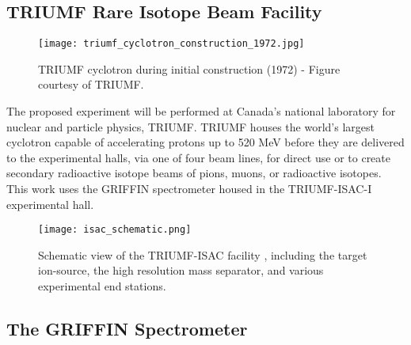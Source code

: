 \documentclass[cnatzke_thesis_proposal.tex]{subfiles}
\begin{document}
\subsection{TRIUMF Rare Isotope Beam Facility}
\begin{figure}[H]
  \begin{center}
    \texttt{[image: triumf\_cyclotron\_construction\_1972.jpg]}
  \end{center}
  \caption{TRIUMF cyclotron during initial construction (1972) - Figure courtesy of TRIUMF.}
  \label{fig:triumf_cyclotron_1972}
\end{figure}

The proposed experiment will be performed at Canada's national laboratory for nuclear and particle physics, TRIUMF. 
TRIUMF houses the world's largest cyclotron \cite{dilling_isac_2014} capable of accelerating protons up to 520 MeV before they are delivered to the experimental halls, via one of four beam lines, for direct use or to create secondary radioactive isotope beams of pions, muons, or radioactive isotopes. 
This work uses the GRIFFIN spectrometer housed in the TRIUMF-ISAC-I experimental hall.

\begin{figure}[htbp]
  \centering
  \texttt{[image: isac\_schematic.png]}
  \caption{Schematic view of the TRIUMF-ISAC facility \cite{dilling_isac_2014}, including the target ion-source, the high resolution mass separator, and various experimental end stations.}
  \label{fig:ISAC_HALL}
\end{figure}

\subsection{The GRIFFIN Spectrometer}
\label{sec:griffin_spectrometer}
\end{document}
